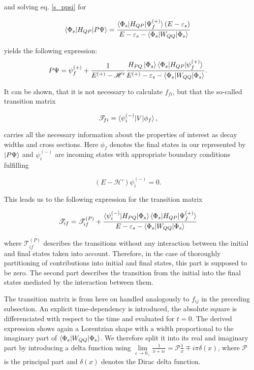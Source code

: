 and solving eq. \ref{s_ppsi} for

\begin{equation}
  \braket{\Phi_s|H_{QP}|P\Psi} = \frac{\braket{\Phi_s|H_{QP}|\Psi_f^{(+)}}(E-\varepsilon_s)}
{E - \varepsilon_s - \braket{\Phi_s|W_{QQ}|\Phi_s}}
\end{equation}

yields the following expression:
\begin{equation}\label{}
  P \Psi = \psi_f^{(+)} + \frac{1}{E^{(+)} - \mathscr{H}'}
           \frac{H_{PQ}\ket{\Phi_s}
           \braket{\Phi_s|H_{QP}|\psi_f^{(+)}}}
           {E^{(+)} - \varepsilon_s - \braket{\Phi_s|W_{QQ}|\Phi_s}} .
\end{equation}

It can be shown, that it is not necessary to calculate $f_{fi}$, but that the
so-called transition matrix

\begin{equation}
  \mathscr{T}_{fi} = \braket{\psi_i^{(-)}|V|\phi_f},
\end{equation}

carries all the necessary information about the properties of interest as
decay widths and cross sections.
Here $\phi_f$ denotes the final states in our represented by $\ket{P \Psi}$ and
$\psi_i^{(-)}$ are incoming states with appropriate boundary conditions fulfilling

\begin{equation}
  (E - \mathscr{H}') \psi_i^{(-)} = 0 .
\end{equation}

This leads us to the following expression for the transition matrix

\begin{equation}
  \mathscr{T}_{if} = \mathscr{T}_{if}^{(P)} + 
                     \frac{\braket{\psi_i^{(-)}|H_{PQ}|\Phi_s}
                           \braket{\Phi_s|H_{QP}|\Psi_f^{(+)}}}
                          {E-\varepsilon_s - \braket{\Phi_s|W_{QQ}|\Phi_s}}
\end{equation}

where $\mathscr{T}_{if}^{(P)}$ describes the transitions without any interaction
between the initial and final states taken into account. Therefore, in the case
of thoroughly partitioning of contributions into initial and final states,
this part is supposed to be zero. The second part describes the transition
from the initial into the final states mediated by the interaction between them.

The transition matrix is from here on handled analogously to $f_{ij}$ in the preceding subsection.
An explicit time-dependency is introduced, the absolute square is differenciated
with respect to the time and evaluated for $t=0$.
The derived expression shows again a Lorentzian shape with a width proportional to
the imaginary part of $\braket{\Phi_s|W_{QQ}|\Phi_s}$. We therefore split it into
its real and imaginary part by introducing a delta function using 
$\lim\limits_{\varepsilon \to 0_+} \frac{1}{x+i\varepsilon} = \mathscr{P} \frac 1x \mp i\pi\delta(x)$,
where $\mathscr{P}$ is the principal part and $\delta(x)$ denotes the
Dirac delta function. \cite{Cohen_Tannoudji_3_2}

